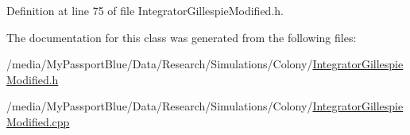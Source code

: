 \-Definition at line 75 of file \-Integrator\-Gillespie\-Modified.\-h.



\-The documentation for this class was generated from the following files\-:\begin{DoxyCompactItemize}
\item 
/media/\-My\-Passport\-Blue/\-Data/\-Research/\-Simulations/\-Colony/\hyperlink{_integrator_gillespie_modified_8h}{\-Integrator\-Gillespie\-Modified.\-h}\item 
/media/\-My\-Passport\-Blue/\-Data/\-Research/\-Simulations/\-Colony/\hyperlink{_integrator_gillespie_modified_8cpp}{\-Integrator\-Gillespie\-Modified.\-cpp}\end{DoxyCompactItemize}
